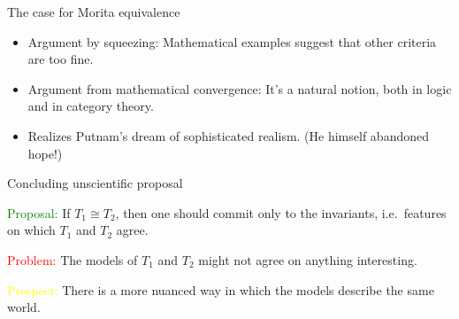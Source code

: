 \documentclass{beamer}
\begin{document}
\begin{frame}{The case for Morita equivalence}

\begin{itemize}
\item Argument by squeezing: Mathematical examples suggest that other
  criteria are too fine.
\item Argument from mathematical convergence: It's a natural notion,
  both in logic and in category theory.
\item Realizes Putnam's dream of sophisticated realism.  (He himself
  abandoned hope!)
\end{itemize}

\end{frame}


\begin{frame}{Concluding unscientific proposal}

  \textcolor{green}{Proposal:} If $T_1\cong T_2$, then one should
  commit only to the invariants, i.e.\ features on which $T_1$ and
  $T_2$ agree.

  \bigskip \textcolor{red}{Problem:} The models of $T_1$ and $T_2$
  might not agree on anything interesting.

  \bigskip \textcolor{yellow}{Prospect:} There is a more nuanced way
  in which the models describe the same world.




\end{frame}
\end{document}
